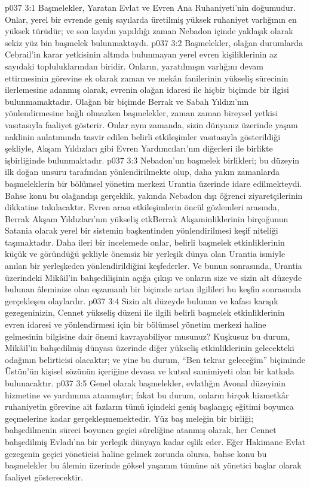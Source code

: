 \vs p037 3:1 Başmelekler, Yaratan Evlat ve Evren Ana Ruhaniyeti’nin doğumudur. Onlar, yerel bir evrende geniş sayılarda üretilmiş yüksek ruhaniyet varlığının en yüksek türüdür; ve son kaydın yapıldığı zaman Nebadon içinde yaklaşık olarak sekiz yüz bin başmelek bulunmaktaydı.
\vs p037 3:2 Başmelekler, olağan durumlarda Cebrail’in karar yetkisinin altında bulunmayan yerel evren kişiliklerinin az sayıdaki topluluklarından biridir. Onların, yaratılmışın varlığını devam ettirmesinin görevine ek olarak zaman ve mekân fanilerinin yükseliş sürecinin ilerlemesine adanmış olarak, evrenin olağan idaresi ile hiçbir biçimde bir ilgisi bulunmamaktadır. Olağan bir biçimde Berrak ve Sabah Yıldızı’nın yönlendirmesine bağlı olmazken başmelekler, zaman zaman bireysel yetkisi vasıtasıyla faaliyet gösterir. Onlar aynı zamanda, sizin dünyanız üzerinde yaşam naklinin anlatımında tasvir edilen belirli etkileşimler vasıtasıyla gösterildiği şekliyle, Akşam Yıldızları gibi Evren Yardımcıları’nın diğerleri ile birlikte işbirliğinde bulunmaktadır.
\vs p037 3:3 Nebadon’un başmelek birlikleri; bu düzeyin ilk doğan unsuru tarafından yönlendirilmekte olup, daha yakın zamanlarda başmeleklerin bir bölümsel yönetim merkezi Urantia üzerinde idare edilmekteydi. Bahse konu bu olağandışı gerçeklik, yakında Nebadon dışı öğrenci ziyaretçilerinin dikkatine takılacaktır. Evren arası etkileşimlerin öncül gözlemleri arasında, Berrak Akşam Yıldızları’nın yükseliş etkBerrak Akşaminliklerinin birçoğunun Satania olarak yerel bir sistemin başkentinden yönlendirilmesi keşif niteliği taşımaktadır. Daha ileri bir incelemede onlar, belirli başmelek etkinliklerinin küçük ve göründüğü şekliyle önemsiz bir yerleşik dünya olan Urantia ismiyle anılan bir yerleşkeden yönlendirildiğini keşfederler. Ve bunun sonrasında, Urantia üzerindeki Mikâil’in bahşedilişinin açığa çıkışı ve onların size ve sizin alt düzeyde bulunan âleminize olan eşzamanlı bir biçimde artan ilgilileri bu keşfin sonrasında gerçekleşen olaylardır.
\vs p037 3:4 Sizin alt düzeyde bulunan ve kafası karışık gezegeninizin, Cennet yükseliş düzeni ile ilgili belirli başmelek etkinliklerinin evren idaresi ve yönlendirmesi için bir bölümsel yönetim merkezi haline gelmesinin bilgisine dair önemi kavrayabiliyor musunuz? Kuşkusuz bu durum, Mikâil’in bahşedilmiş dünyası üzerinde diğer yükseliş etkinliklerinin gelecekteki odağının belirticisi olacaktır; ve yine bu durum, “Ben tekrar geleceğim” biçiminde Üstün’ün kişisel sözünün içeriğine devasa ve kutsal samimiyeti olan bir katkıda bulunacaktır.
\vs p037 3:5 Genel olarak başmelekler, evlatlığın Avonal düzeyinin hizmetine ve yardımına atanmıştır; fakat bu durum, onların birçok hizmetkâr ruhaniyetin görevine ait fazların tümü içindeki geniş başlangıç eğitimi boyunca geçmelerine kadar gerçekleşmemektedir. Yüz baş meleğin bir birliği; bahşedilmenin süreci boyunca geçici süreliğine atanmış olarak, her Cennet bahşedilmiş Evladı’na bir yerleşik dünyaya kadar eşlik eder. Eğer Hakimane Evlat gezegenin geçici yöneticisi haline gelmek zorunda olursa, bahse konu bu başmelekler bu âlemin üzerinde göksel yaşamın tümüne ait yönetici başlar olarak faaliyet gösterecektir.
